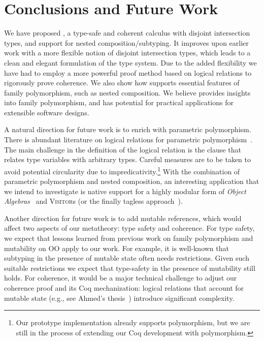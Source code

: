 
\section{Conclusions and Future Work}
\label{sec:conclusion}

We have proposed \name, a type-safe and coherent calculus with disjoint
intersection types, and support for nested composition/subtyping. It
improves upon earlier work with a more
flexible notion of disjoint intersection types, which leads to
a clean and elegant formulation of the type system. Due to the added
flexibility we have had to employ a more powerful proof method based on logical
relations to rigorously prove coherence.
We also show how \name supports essential features of family
polymorphism, such as nested composition. We believe \name provides insights into family polymorphism, and
has potential for practical applications for extensible software designs.

A natural direction for future work is to enrich \name with parametric
polymorphism. There is abundant literature on logical relations for parametric
polymorphism~\cite{reynolds1983types}. %
The main challenge in the definition of the
logical relation is the clause that relates type variables with arbitrary types. Careful
measures are to be taken to avoid potential circularity due to
impredicativity.\footnote{ Our prototype implementation already
  supports polymorphism, but we are still in the process of extending our Coq
  development with polymorphism.} With the combination of parametric polymorphism and nested
composition, an interesting application that we intend to investigate is native
support for a highly modular form of \textit{Object Algebras}~\cite{oliveira2012extensibility, xuan_traits} and \textsc{Visitor}s
(or the finally tagless approach~\cite{CARETTE_2009}).

Another direction for future work is to add mutable references, which would
affect two aspects of our metatheory: type safety and coherence. For type safety,
we expect that lessons learned from previous work on family polymorphism and
mutability on OO apply to our work. For example, it is well-known that
subtyping in the presence of mutable state often needs restrictions. Given such
suitable restrictions we expect that type-safety in the presence of mutability
still holds. For coherence, it would be a major technical challenge to adjust
our coherence proof and its Coq mechanization: logical relations that account
for mutable state (e.g., see Ahmed's thesis~\cite{ahmed2004semantics}) introduce significant complexity.





